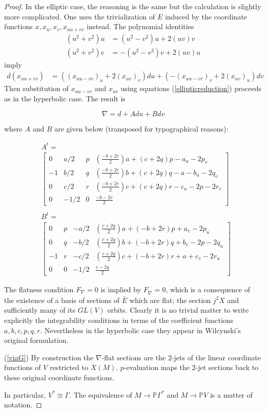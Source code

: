 \documentclass[11pt]{article}
\numberwithin{equation}{section}
\theoremstyle{plain}
\theoremstyle{remark}
\renewcommand{\P}{\mathbb{P}}
\newcommand{\GL}{GL}
\begin{document}
\begin{proof}
In the elliptic case, the reasoning is the same but the calculation is slightly more complicated. One uses the trivialization of $E$ induced by the coordinate functions $x,x_u,x_v,x_{uu+vv}$ instead. The polynomial identities
\begin{align*}
 (u^2+v^2)u&= (u^2-v^2)u+2(uv)v\\
 (u^2+v^2)v&=-(u^2-v^2)v+2(uv)u
\end{align*}
imply
\begin{align*}
d(x_{uu+vv})&= \left( (x_{uu-vv})_u + 2(x_{uv})_v \right)du +\left( -(x_{uu-vv})_v + 2(x_{uv})_u \right)dv
\end{align*}
Then substitution of $x_{uu-vv}$ and $x_{uv}$ using equations (\ref{ellipticreduction}) proceeds as in the hyperbolic case. The result is

\[ \nabla= d+ Adu + Bdv \]

where $A$ and $B$ are given below (transposed for typographical reasons):

\begin{align*}
&A^{t}=\\
&\begin{bmatrix}
0  & a/2 & p & (\tfrac{-b+2r}{2})a+(c+2q)p -a_u-2p_v     \\
-1 & b/2 & q & (\tfrac{-b+2r}{2})b+(c+2q)q -a-b_u-2q_v   \\
0  & c/2 & r & (\tfrac{-b+2r}{2})c+(c+2q)r -c_u-2p-2r_v  \\
0  & -1/2& 0 &  \tfrac{-b-2r}{2}
\end{bmatrix}\\
\\
&B^{t}=\\
&\begin{bmatrix}
0  & p & -a/2 & (\tfrac{c+2q}{2})a +(-b+2r)p +a_v-2p_u    \\
0  & q & -b/2 & (\tfrac{c+2q}{2})b +(-b+2r)q +b_v-2p-2q_u \\
-1 & r & -c/2 & (\tfrac{c+2q}{2})c +(-b+2r)r +a+c_v-2r_u  \\
0  & 0 & -1/2 & \tfrac{c-2q}{2} 
\end{bmatrix}
\end{align*}

The flatness condition $F_{\nabla}=0$ is implied by $F_{\bar{\nabla}}=0$, which is a consequence of the existence of a basis of sections of $\bar{E}$ which are flat; the section $j^{2}X$ and sufficiently many of its $\GL(V)$ orbits. Clearly it is no trivial matter to write explicitly the integrability conditions in terms of the coefficient functions $a,b,c,p,q,r$. Nevertheless in the hyperbolic case they appear in Wilcynski's original formulation.

(\ref{viaG}) By construction the $\nabla$-flat sections are the $2$-jets of the linear coordinate functions of $V$ restricted to $X(M)$. $p$-evaluation maps the $2$-jet sections back to these original coordinate functions.

In particular, $V^{*}\cong \Gamma$. The equivalence of $M\rightarrow \P \Gamma^{*}$ and $M\rightarrow \P V$ is a matter of notation.
\end{proof}
\end{document}
